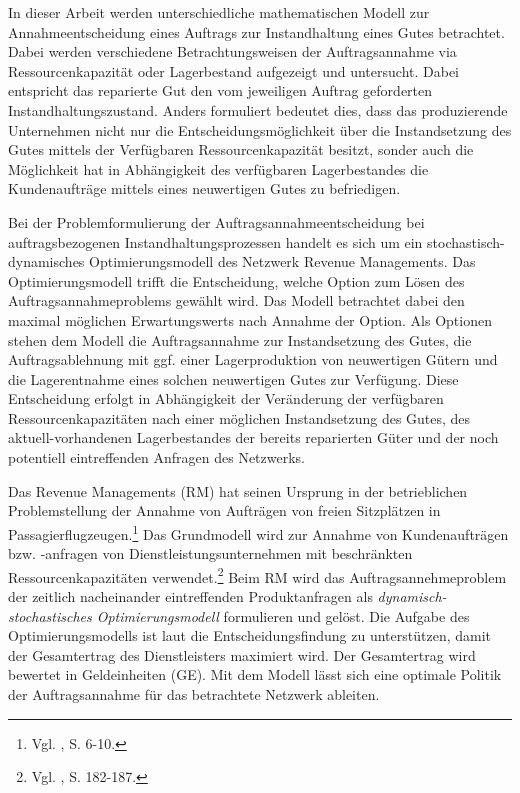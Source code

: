 In dieser Arbeit werden unterschiedliche mathematischen Modell zur Annahmeentscheidung eines Auftrags zur Instandhaltung eines Gutes betrachtet. Dabei werden verschiedene Betrachtungsweisen der Auftragsannahme via Ressourcenkapazität oder Lagerbestand aufgezeigt und untersucht. %
Dabei entspricht das reparierte Gut den vom jeweiligen Auftrag geforderten Instandhaltungszustand. Anders formuliert bedeutet dies, dass das produzierende Unternehmen nicht nur die Entscheidungsmöglichkeit über die Instandsetzung des Gutes mittels der Verfügbaren Ressourcenkapazität besitzt, sonder auch die Möglichkeit hat in Abhängigkeit des verfügbaren Lagerbestandes die Kundenaufträge mittels eines neuwertigen Gutes zu befriedigen.

Bei der Problemformulierung der Auftragsannahmeentscheidung bei auftragsbezogenen Instandhaltungsprozessen handelt es sich um ein stochastisch-dynamisches Optimierungsmodell des Netzwerk Revenue Managements. Das Optimierungsmodell trifft die Entscheidung, welche Option zum Lösen des Auftragsannahmeproblems gewählt wird. Das Modell betrachtet dabei den maximal möglichen Erwartungswerts nach Annahme der Option. Als Optionen stehen dem Modell die Auftragsannahme zur Instandsetzung des Gutes, die Auftragsablehnung mit ggf. einer Lagerproduktion von neuwertigen Gütern und die Lagerentnahme eines solchen neuwertigen Gutes zur Verfügung. Diese Entscheidung erfolgt in Abhängigkeit der Veränderung der verfügbaren Ressourcenkapazitäten nach einer möglichen Instandsetzung des Gutes, des aktuell-vorhandenen Lagerbestandes der bereits reparierten Güter und der noch potentiell eintreffenden Anfragen des Netzwerks.

Das Revenue Managements (RM) hat seinen Ursprung in der betrieblichen Problemstellung der Annahme von Aufträgen von freien Sitzplätzen in Passagierflugzeugen.\footnote{Vgl. \cite{talluri2004theory}, S. 6-10.} Das Grundmodell wird zur Annahme von Kundenaufträgen bzw. -anfragen von Dienstleistungsunternehmen mit beschränkten Ressourcenkapazitäten verwendet.\footnote{Vgl. \cite{Petrick:2009aa}, S. 182-187.} %
Beim RM wird das Auftragsannehmeproblem der zeitlich nacheinander eintreffenden Produktanfragen als \textit{dynamisch-stochastisches Optimierungsmodell} formulieren und gelöst.
Die Aufgabe des Optimierungsmodells ist laut \cite{talluri2004theory} die Entscheidungsfindung zu unterstützen, damit der Gesamtertrag des Dienstleisters maximiert wird. Der Gesamtertrag wird bewertet in Geldeinheiten (GE). Mit dem Modell lässt sich eine optimale Politik der Auftragsannahme für das betrachtete Netzwerk ableiten.

